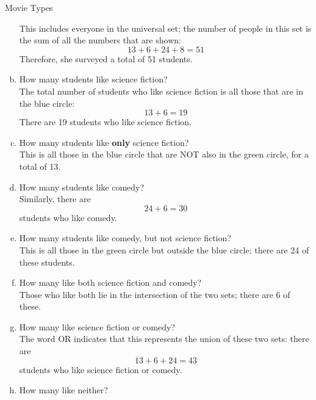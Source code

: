 \begin{example}[https://www.youtube.com/watch?v=Nkay8g-5suM]{Movie Types}
\begin{enumerate}[(a)]
This includes everyone in the universal set; the number of people in this set is the sum of all the numbers that are shown:
\[13+6+24+8 = 51\]
Therefore, she surveyed a total of 51 students.\\

\item How many students like science fiction?\\

The total number of students who like science fiction is all those that are in the blue circle:
\[13+6 = 19\]
There are 19 students who like science fiction.\\

\item How many students like \textbf{only} science fiction?\\

This is all those in the blue circle that are NOT also in the green circle, for a total of 13.\\

\item How many students like comedy?\\

Similarly, there are \[24+6 = 30\] students who like comedy.\\

\item How many students like comedy, but not science fiction?\\

This is all those in the green circle but outside the blue circle; there are 24 of these students.\\

\item How many like both science fiction and comedy?\\

Those who like both lie in the intersection of the two sets; there are 6 of these.\\

\item How many like science fiction or comedy?\\

The word OR indicates that this represents the union of these two sets: there are \[13+6+24 = 43\] students who like science fiction or comedy.\\

\item How many like neither?\\


\end{enumerate}
\end{example}
